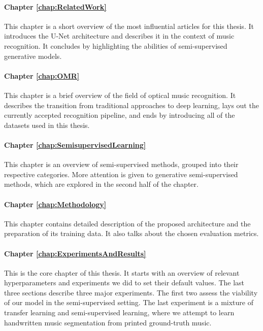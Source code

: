 \paragraph*{Chapter \ref{chap:RelatedWork}} This chapter is a short overview of the most influential articles for this thesis. It introduces the U-Net architecture and describes it in the context of music recognition. It concludes by highlighting the abilities of semi-supervised generative models.

\paragraph*{Chapter \ref{chap:OMR}} This chapter is a brief overview of the field of optical music recognition. It describes the transition from traditional approaches to deep learning, lays out the currently accepted recognition pipeline, and ends by introducing all of the datasets used in this thesis.

\paragraph*{Chapter \ref{chap:SemisupervisedLearning}} This chapter is an overview of semi-supervised methods, grouped into their respective categories. More attention is given to generative semi-supervised methods, which are explored in the second half of the chapter.

\paragraph*{Chapter \ref{chap:Methodology}} This chapter contains detailed description of the proposed architecture and the preparation of its training data. It also talks about the chosen evaluation metrics.

\paragraph*{Chapter \ref{chap:ExperimentsAndResults}} This is the core chapter of this thesis. It starts with an overview of relevant hyperparameters and experiments we did to set their default values. The last three sections describe three major experiments. The first two assess the viability of our model in the semi-supervised setting. The last experiment is a mixture of transfer learning and semi-supervised learning, where we attempt to learn handwritten music segmentation from printed ground-truth music.


